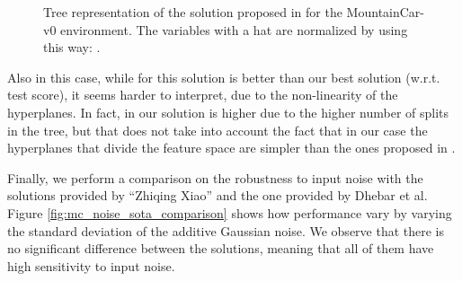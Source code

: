 \documentclass[review,english]{elsarticle}
\begin{document}
\begin{center}
    \begin{figure}[!ht]
        \centering
    \caption{Tree representation of the solution proposed in \cite{dhebar_interpretable-ai_2020} for the MountainCar-v0 environment.
    The variables with a hat are normalized by using this way: .}
    \label{fig:mc_tree_dhebar}
    \end{figure}
\end{center}

Also in this case, while  for this solution is better than our best solution (w.r.t. test score), it seems harder to interpret, due to the non-linearity of the hyperplanes.
In fact, in our solution  is higher due to the higher number of splits in the tree, but that does not take into account the fact that in our case the hyperplanes that divide the feature space are simpler than the ones proposed in \cite{dhebar_interpretable-ai_2020}.

Finally, we perform a comparison on the robustness to input noise with the solutions provided by ``Zhiqing Xiao'' and the one provided by Dhebar et al.
Figure \ref{fig:mc_noise_sota_comparison} shows how performance vary by varying the standard deviation of the additive Gaussian noise.
We observe that there is no significant difference between the solutions, meaning that all of them have high sensitivity to input noise.
\end{document}
